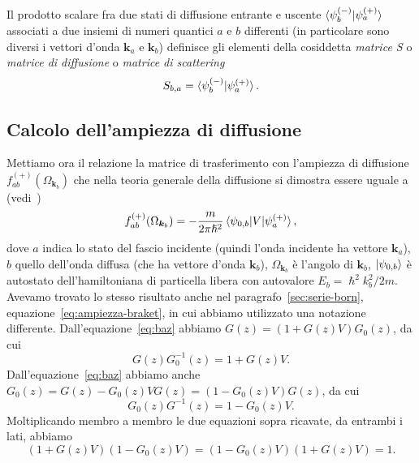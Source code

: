 \documentclass[a4paper,fleqn,twoside,12pt]{article}
\begin{document}
Il prodotto scalare fra due stati di diffusione entrante e uscente
$\braket{\psi_{b}^{(-)} | \psi_{a}^{(+)}}$ associati a due insiemi di numeri
quantici $a$ e $b$ differenti (in particolare sono diversi i vettori d'onda
$\bm{k}_{a}$ e $\bm{k}_{b}$) definisce gli elementi della cosiddetta
\emph{matrice S} o \emph{matrice di diffusione} o \emph{matrice di scattering}
\begin{equation}
  S_{b,a} = \braket{\psi_{b}^{(-)} | \psi_{a}^{(+)}}.
\end{equation}

\subsection{Calcolo dell'ampiezza di diffusione}
\label{sec:oper-ampiezza-diffusione}

Mettiamo ora il relazione la matrice di trasferimento con l'ampiezza di
diffusione $f_{ab}^{(+)}(\Omega_{\bm{k}_{b}})$ che nella teoria generale della
diffusione si dimostra essere uguale a
(vedi~\textcite[436-441]{ballentine:quantum-mechanics})
\begin{equation}
  \label{eq:ampiezza-generale}
  f_{ab}^{(+)}(\Omega_{\bm{k}_{b}}) = -\frac{m}{2\pi\hslash^{2}}
  \braket{\psi_{0,b} | V | \psi_{a}^{(+)}},
\end{equation}
dove $a$ indica lo stato del fascio incidente (quindi l'onda incidente ha
vettore $\bm{k}_{a}$), $b$ quello dell'onda diffusa (che ha vettore d'onda
$\bm{k}_{b}$), $\Omega_{\bm{k}_{b}}$ è l'angolo di $\bm{k}_{b}$,
$\ket{\psi_{0,b}}$ è autostato dell'hamiltoniana di particella libera con
autovalore $E_{b} = \hslash^{2}k_{b}^{2}/2m$.  Avevamo trovato lo stesso
risultato anche nel paragrafo~\ref{sec:serie-born},
equazione~\eqref{eq:ampiezza-braket}, in cui abbiamo utilizzato una notazione
differente.  Dall'equazione~\eqref{eq:baz} abbiamo $G(z) = (1 + G(z)V)G_{0}(z)$,
da cui
\begin{equation}
  G(z)G_{0}^{-1}(z) = 1 + G(z)V.
\end{equation}
Dall'equazione~\eqref{eq:baz} abbiamo anche $G_{0}(z) = G(z) - G_{0}(z)VG(z) =
(1 - G_{0}(z)V)G(z)$, da cui
\begin{equation}
  G_{0}(z)G^{-1}(z) = 1 - G_{0}(z)V.
\end{equation}
Moltiplicando membro a membro le due equazioni sopra ricavate, da entrambi i
lati, abbiamo
\begin{equation}
  (1 + G(z)V)(1 - G_{0}(z)V) = (1 - G_{0}(z)V)(1 + G(z)V) = 1.
\end{equation}
\end{document}
